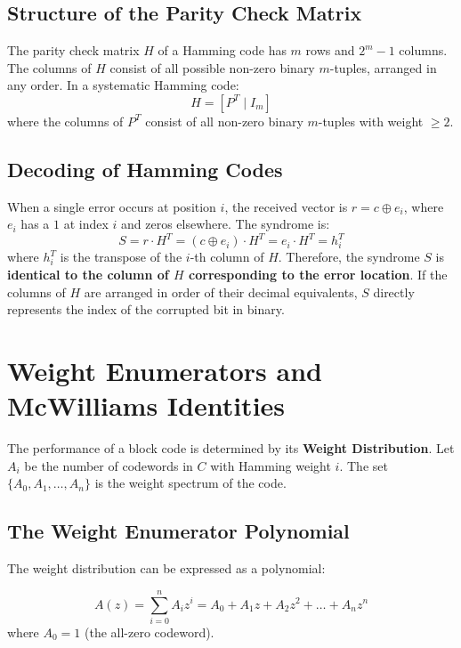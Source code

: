 \documentclass[12pt,a4paper]{article}
\begin{document}
\subsection{Structure of the Parity Check Matrix}
The parity check matrix $H$ of a Hamming code has $m$ rows and $2^m - 1$ columns. The columns of $H$ consist of all possible non-zero binary $m$-tuples, arranged in any order. In a systematic Hamming code:
\[ H = [P^T \mid I_m] \]
where the columns of $P^T$ consist of all non-zero binary $m$-tuples with weight $\ge 2$.

\subsection{Decoding of Hamming Codes}
When a single error occurs at position $i$, the received vector is $r = c \oplus e_i$, where $e_i$ has a $1$ at index $i$ and zeros elsewhere. The syndrome is:
\[ S = r \cdot H^T = (c \oplus e_i) \cdot H^T = e_i \cdot H^T = h_i^T \]
where $h_i^T$ is the transpose of the $i$-th column of $H$. Therefore, the syndrome $S$ is \textbf{identical to the column of $H$ corresponding to the error location}. If the columns of $H$ are arranged in order of their decimal equivalents, $S$ directly represents the index of the corrupted bit in binary.

\section{Weight Enumerators and McWilliams Identities}

The performance of a block code is determined by its \textbf{Weight Distribution}. Let $A_i$ be the number of codewords in $C$ with Hamming weight $i$. The set $\{A_0, A_1, \dots, A_n\}$ is the weight spectrum of the code.

\subsection{The Weight Enumerator Polynomial}
The weight distribution can be expressed as a polynomial:
\begin{tcolorbox}[defbox, title={\textbf{Weight Enumerator Polynomial}}]
\[ A(z) = \sum_{i=0}^n A_i z^i = A_0 + A_1 z + A_2 z^2 + \dots + A_n z^n \]
where $A_0 = 1$ (the all-zero codeword).
\end{tcolorbox}
\end{document}
